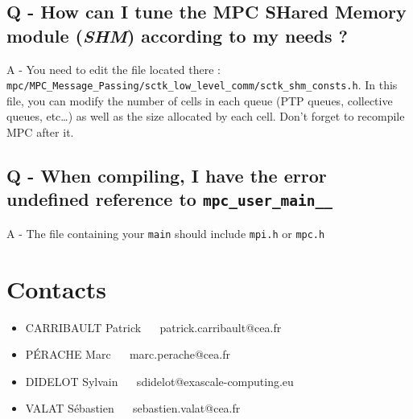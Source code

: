 \documentclass[a4paper,11pt]{article}
\begin{document}
\subsection*{Q - How can I tune the MPC SHared Memory module (\emph{SHM}) according to my needs ?}
A - You need to edit the file located there : \\{\tt mpc/MPC\_Message\_Passing/sctk\_low\_level\_comm/sctk\_shm\_consts.h}. In this file, you can modify the number of cells in each queue (PTP queues, collective queues, etc\dots) as well as the size allocated by each cell. Don't forget to recompile MPC after it.

\subsection*{Q - When compiling, I have the error undefined reference to \texttt{mpc\_user\_main\_\_}}
A - The file containing your \texttt{main} should include \texttt{mpi.h} or \texttt{mpc.h}

\section{Contacts}
\begin{itemize}
  \item CARRIBAULT Patrick $\quad$ patrick.carribault@cea.fr
  \item P\'{E}RACHE Marc $\quad$ marc.perache@cea.fr
  \item DIDELOT Sylvain $\quad$ sdidelot@exascale-computing.eu
  \item VALAT S\'{e}bastien $\quad$ sebastien.valat@cea.fr
\end{itemize}


\end{document}
